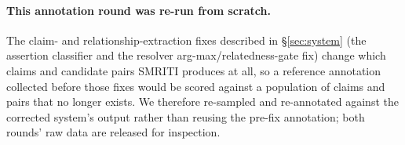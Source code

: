 \paragraph{This annotation round was re-run from scratch.} The claim- and
relationship-extraction fixes described in \S\ref{sec:system} (the
assertion classifier and the resolver arg-max/relatedness-gate fix) change
which claims and candidate pairs SMRITI produces at all, so a reference
annotation collected before those fixes would be scored against a
population of claims and pairs that no longer exists. We therefore
re-sampled and re-annotated against the corrected system's output rather
than reusing the pre-fix annotation; both rounds' raw data are released for
inspection.
